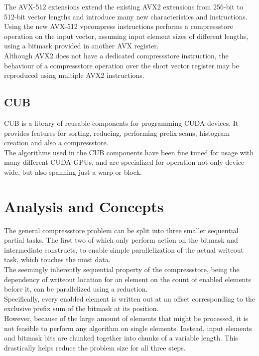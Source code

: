 \documentclass{tudscrreprt}
\begin{document}
			The AVX-512 extensions extend the existing AVX2 extensions from 256-bit to 512-bit vector lengths and introduce many new characteristics and instructions. Using the new AVX-512 vpcompress instructions performs a compressstore operation on the input vector, assuming input element sizes of different lengths, using a bitmask provided in another AVX register. \\
			
			Although AVX2 does not have a dedicated compressstore instruction, the behaviour of a compressstore operation over the short vector register may be reproduced using multiple AVX2 instructions. \\
		
		\section{CUB}
			CUB is a library of reusable components for programming CUDA devices. It provides features for sorting, reducing, performing prefix scans, histogram creation and also a compressstore. \\
			The algorithms used in the CUB components have been fine tuned for usage with many different CUDA GPUs, and are specialized for operation not only device wide, but also spanning just a warp or block. \\
		
	\chapter{Analysis and Concepts}
		The general compressstore problem can be split into three smaller sequential partial tasks. The first two of which only perform action on the bitmask and intermediate constructs, to enable simple parallelization of the actual writeout task, which touches the most data. \\
		
		The seemingly inherently sequential property of the compressstore, being the dependency of writeout location for an element on the count of enabled elements before it, can be parallelized using a reduction. \\
		Specifically, every enabled element is written out at an offset corresponding to the exclusive prefix sum of the bitmask at its position. \\
		
		However, because of the large amount of elements that might be processed, it is not feasible to perform any algorithm on single elements. Instead, input elements and bitmask bits are chunked together into chunks of a variable length. This drastically helps reduce the problem size for all three steps. \\
		
\end{document}
